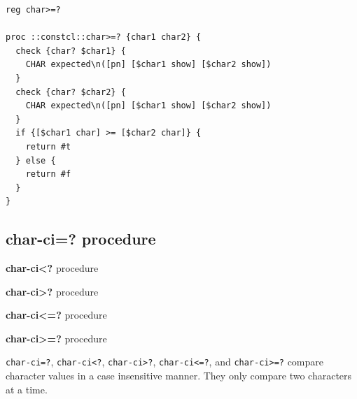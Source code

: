 \documentclass[twoside,9pt]{report}
\begin{document}
\begin{lstlisting}
reg char>=?

proc ::constcl::char>=? {char1 char2} {
  check {char? $char1} {
    CHAR expected\n([pn] [$char1 show] [$char2 show])
  }
  check {char? $char2} {
    CHAR expected\n([pn] [$char1 show] [$char2 show])
  }
  if {[$char1 char] >= [$char2 char]} {
    return #t
  } else {
    return #f
  }
}
\end{lstlisting}
\subsection{char-ci=? procedure}
\label{char-ci=?-procedure}

\noindent \textbf{char-ci<?} procedure


\noindent \textbf{char-ci>?} procedure


\noindent \textbf{char-ci<=?} procedure


\noindent \textbf{char-ci>=?} procedure



\texttt{char-ci=?}, \texttt{char-ci<?}, \texttt{char-ci>?}, \texttt{char-ci<=?}, and \texttt{char-ci>=?} compare character values in a case insensitive manner. They only compare two characters at a time.
\end{document}
